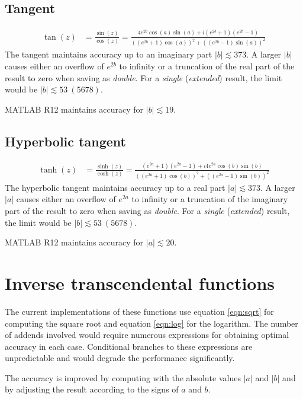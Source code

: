 \documentclass[11pt,a4paper,twoside]{article}
\begin{document}
\subsection{Tangent}
\begin{align}
	\tan{(z)}	& = \frac{\sin{(z)}}{\cos{(z)}} = \frac{4e^{2b}\cos{(a)}\sin{(a)} + i\left(e^{2b} + 1\right)\left(e^{2b} - 1\right)}{\left(\left(e^{2b} + 1\right)\cos{(a)}\right)^2 + \left(\left(e^{2b} - 1\right)\sin{(a)}\right)^2}
\end{align}
The tangent maintains accuracy up to an imaginary part $|b| \lesssim 373$.
A larger $|b|$ causes either an overflow of $e^{2b}$ to infinity or a truncation of the real part of the result to zero when saving as \textit{double}.
For a \textit{single} (\textit{extended}) result, the limit would be $|b| \lesssim 53~(5678)$.

MATLAB R12 maintains accuracy for $|b| \lesssim 19$.

\subsection{Hyperbolic tangent}
\begin{align}
	\tanh{(z)}	& = \frac{\sinh{(z)}}{\cosh{(z)}} = \frac{\left(e^{2a} + 1\right)\left(e^{2a} - 1\right) + i4e^{2a}\cos{(b)}\sin{(b)}}{\left(\left(e^{2a} + 1\right)\cos{(b)}\right)^2 + \left(\left(e^{2a} - 1\right)\sin{(b)}\right)^2}
\end{align}
The hyperbolic tangent maintains accuracy up to a real part $|a| \lesssim 373$.
A larger $|a|$ causes either an overflow of $e^{2a}$ to infinity or a truncation of the imaginary part of the result to zero when saving as \textit{double}.
For a \textit{single} (\textit{extended}) result, the limit would be $|b| \lesssim 53~(5678)$.

MATLAB R12 maintains accuracy for $|a| \lesssim 20$.


\clearpage
\section{Inverse transcendental functions}
The current implementations of these functions use equation \eqref{eqn:sqrt} for computing the square root and equation \eqref{eqn:log} for the logarithm.
The number of addends involved would require numerous expressions for obtaining optimal accuracy in each case.
Conditional branches to these expressions are unpredictable and would degrade the performance significantly.

The accuracy is improved by computing with the absolute values $|a|$ and $|b|$ and by adjusting the result according to the signs of $a$ and $b$.
\end{document}

